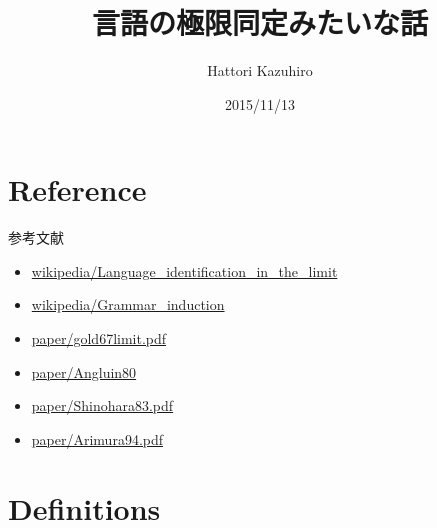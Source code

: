 \documentclass[professionalfont, 12pt, dvipdfmx, default, cjk]{beamer}
\title{言語の極限同定みたいな話}
\author{Hattori Kazuhiro}
\date{2015/11/13}
\begin{document}
\frame{\titlepage}

\section{Reference}\label{reference}

\begin{frame}{参考文献}

\begin{itemize}
\itemsep1pt\parskip0pt
\item
  \href{https://en.wikipedia.org/wiki/Language_identification_in_the_limit}{wikipedia/Language\_identification\_in\_the\_limit}
\item
  \href{https://en.wikipedia.org/wiki/Grammar_induction}{wikipedia/Grammar\_induction}
\item
  \href{http://web.mit.edu/6.863/www/spring2010/readings/gold67limit.pdf}{paper/gold67limit.pdf}
\item
  \href{http://www.sciencedirect.com/science/article/pii/0022000080900410}{paper/Angluin80}
\item
  \href{http://repository.kulib.kyoto-u.ac.jp/dspace/bitstream/2433/103408/1/0482-7.pdf}{paper/Shinohara83.pdf}
\item
  \href{http://www-ikn.ist.hokudai.ac.jp/~arim/papers/arimura_stacs94.pdf}{paper/Arimura94.pdf}
\end{itemize}

\end{frame}

\section{Definitions}\label{definitions}
\end{document}
